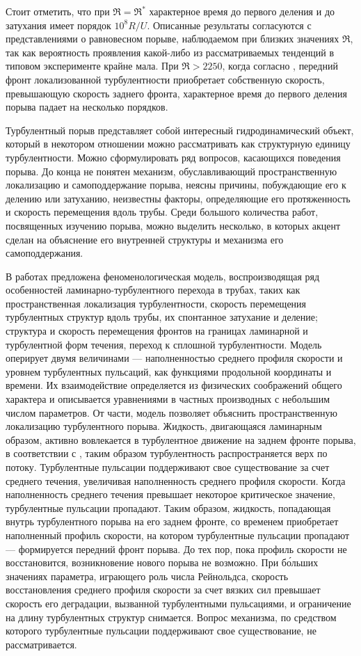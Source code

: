 Стоит отметить, что при $\Re = \Re^*$ характерное время до первого деления и до затухания имеет порядок $10^8 R/U$. Описанные результаты согласуются с представлениями о равновесном порыве, наблюдаемом при близких значениях $\Re$, так как вероятность проявления какой-либо из рассматриваемых тенденций в типовом эксперименте крайне мала. При $\Re > 2250$, когда согласно \cite{Moxey2010}, передний фронт локализованной турбулентности приобретает собственную скорость, превышающую скорость заднего фронта, характерное время до первого деления порыва падает на несколько порядков. 

Турбулентный порыв представляет собой интересный гидродинамический объект, который в некотором отношении можно рассматривать как структурную единицу турбулентности. Можно сформулировать ряд вопросов, касающихся поведения порыва. До конца не понятен механизм, обуславливающий пространственную локализацию и самоподдержание порыва, неясны причины, побуждающие его к делению или затуханию, неизвестны факторы, определяющие его протяженность и скорость перемещения вдоль трубы. Среди большого количества работ, посвященных изучению порыва, можно выделить несколько, в которых акцент сделан на объяснение его внутренней структуры и механизма его самоподдержания. 

В работах \cite{Barkley2015, Barkley2016} предложена феноменологическая модель, воспроизводящая ряд особенностей ламинарно-турбулентного перехода в трубах, таких как пространственная локализация турбулентности, скорость перемещения турбулентных структур вдоль трубы, их спонтанное затухание и деление; структура и скорость перемещения фронтов на границах ламинарной и турбулентной форм течения, переход к сплошной турбулентности. Модель оперирует двумя величинами --- наполненностью среднего профиля скорости и уровнем турбулентных пульсаций, как функциями продольной координаты и времени. Их взаимодействие определяется из физических соображений общего характера и описывается уравнениями в частных производных с небольшим числом параметров. От части, модель позволяет объяснить пространственную локализацию турбулентного порыва. Жидкость, двигающаяся ламинарным образом, активно вовлекается в турбулентное движение на заднем фронте порыва, в соответствии с \cite{Song2017}, таким образом турбулентность распространяется верх по потоку. Турбулентные пульсации поддерживают свое существование за счет среднего течения, увеличивая наполненность среднего профиля скорости. Когда наполненность среднего течения превышает некоторое критическое значение, турбулентные пульсации пропадают. Таким образом, жидкость, попадающая внутрь турбулентного порыва на его заднем фронте, со временем приобретает наполненный профиль скорости, на котором турбулентные пульсации пропадают --- формируется передний фронт порыва. До тех пор, пока профиль скорости не восстановится, возникновение нового порыва не возможно. При б\'{о}льших значениях параметра, играющего роль числа Рейнольдса, скорость восстановления среднего профиля скорости за счет вязких сил превышает скорость его деградации, вызванной турбулентными пульсациями, и ограничение на длину турбулентных структур снимается. Вопрос механизма, по средством которого турбулентные пульсации поддерживают свое существование, не рассматривается.

